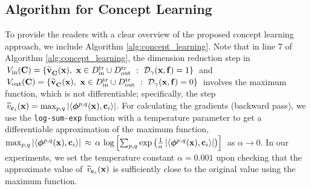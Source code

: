 \subsection{Algorithm for Concept Learning}
\label{sec:appendix-algo}
To provide the readers with a clear overview of the proposed concept learning approach, we include Algorithm \ref{alg:concept_learning}.
Note that in line 7 of Algorithm \ref{alg:concept_learning}, the dimension reduction step in $\,V_{\textrm{in}}(\mathbf{C}) = \{\widetilde{\mathbf{v}}^{}_{\mathbf{C}}(\mathbf{x}), ~\mathbf{x} \in D_{\textrm{in}}^{\textrm{tr}} \cup D_{\textrm{out}}^{\textrm{tr}} ~:~ \mathcal{D}_\gamma(\mathbf{x}, \mathbf{f}) = 1\}\,$ and $\,V_{\textrm{out}}(\mathbf{C}) = \{\widetilde{\mathbf{v}}^{}_{\mathbf{C}}(\mathbf{x}), ~\mathbf{x} \in D_{\textrm{in}}^{\textrm{tr}} \cup D_{\textrm{out}}^{\textrm{tr}} ~:~ \mathcal{D}_\gamma(\mathbf{x}, \mathbf{f}) = 0\}\,$ involves the maximum function, which is not differentiable; specifically, the step $\,\widetilde{v}_{\mathbf{c}_i}(\mathbf{x}) = \max_{p, q} |\langle \bm{\phi}^{p,q}(\mathbf{x}), \mathbf{c}_i \rangle|$.
For calculating the gradients (backward pass), we use the \texttt{log-sum-exp} function with a temperature parameter to get a differentiable approximation of the maximum function, \ie $\max_{p, q} |\langle \bm{\phi}^{p,q}(\mathbf{x}), \mathbf{c}_i \rangle| \,\approx\, \alpha \,\log \left[ \sum_{p,q} \exp\left( \frac{1}{\alpha} \,|\langle \bm{\phi}^{p,q}(\mathbf{x}), \mathbf{c}_i \rangle| \right) \right]\,$ as $\alpha \rightarrow 0$.
In our experiments, we set the temperature constant $\alpha = 0.001$ upon checking that the approximate value of $\,\widetilde{v}_{\mathbf{c}_i}(\mathbf{x})$ is sufficiently close to the original value using the maximum function.

